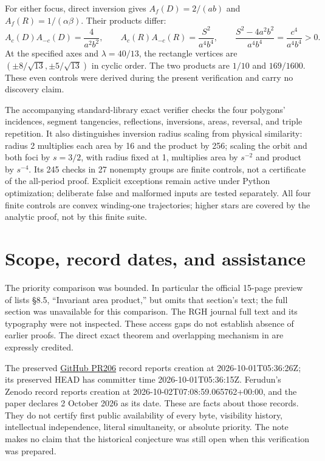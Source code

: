 \documentclass[11pt]{article}
\begin{document}
For either focus, direct inversion gives \(A_f(D)=2/(ab)\) and
\(A_f(R)=1/(\alpha\beta)\). Their products differ:
\[
 A_c(D)A_{-c}(D)=\frac4{a^2b^2},\qquad
 A_c(R)A_{-c}(R)=\frac{S^2}{a^4b^4},\qquad
 \frac{S^2-4a^2b^2}{a^4b^4}=\frac{c^4}{a^4b^4}>0.
\]
At the specified axes and \(\lambda=40/13\), the rectangle vertices
are \((\pm8/\sqrt{13},\pm5/\sqrt{13})\) in cyclic order. The two
products are \(1/10\) and \(169/1600\). These even controls were
derived during the present verification and carry no discovery claim.

The accompanying standard-library exact verifier checks the four
polygons' incidences, segment tangencies, reflections, inversions,
areas, reversal, and triple repetition. It also distinguishes inversion
radius scaling from physical similarity: radius 2 multiplies each
area by 16 and the product by 256; scaling the orbit and both foci by
\(s=3/2\), with radius fixed at 1, multiplies area by \(s^{-2}\) and
product by \(s^{-4}\). Its 245 checks in 27 nonempty groups are finite
controls, not a certificate of the all-period proof. Explicit exceptions
remain active under Python optimization; deliberate false and malformed
inputs are tested separately. All four finite controls are convex
winding-one trajectories; higher stars are covered by the analytic
proof, not by this finite suite.

\section{Scope, record dates, and assistance}\label{sec:limits}

The priority comparison was bounded. In particular the official
15-page preview of \cite{Book} lists \S8.5, ``Invariant area product,''
but omits that section's text; the full section was unavailable for this
comparison. The RGH journal full text and its typography were not
inspected. These access gaps do not establish absence of earlier proofs.
The direct exact theorem and overlapping mechanism in \cite{Ferudun}
are expressly credited.

The preserved \href{https://github.com/AlecKriebel/Math/pull/206}{GitHub
PR206} record reports creation at 2026-10-01T05:36:26Z; its preserved
HEAD has committer time 2026-10-01T05:36:15Z. Ferudun's Zenodo record
reports creation at 2026-10-02T07:08:59.065762+00:00, and the paper
declares 2 October 2026 as its date. These are facts about those records.
They do not certify first public availability of every byte, visibility
history, intellectual independence, literal simultaneity, or absolute
priority. The note makes no claim that the historical conjecture was
still open when this verification was prepared.
\end{document}
